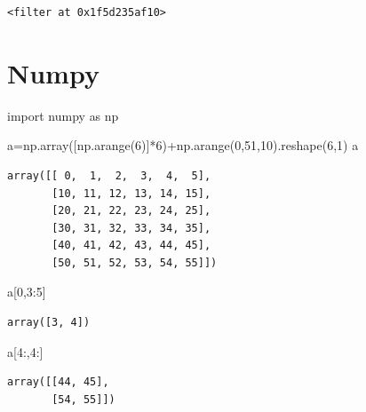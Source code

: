 \documentclass[
  a4paper,
  DIV=11,
  numbers=noendperiod]{scrreprt}
\newenvironment{Shaded}{\begin{snugshade}}{\end{snugshade}}
\newcommand{\DecValTok}[1]{\textcolor[rgb]{0.68,0.00,0.00}{#1}}
\newcommand{\ImportTok}[1]{\textcolor[rgb]{0.00,0.46,0.62}{#1}}
\newcommand{\NormalTok}[1]{\textcolor[rgb]{0.00,0.23,0.31}{#1}}
\newcommand{\OperatorTok}[1]{\textcolor[rgb]{0.37,0.37,0.37}{#1}}
\begin{document}
\begin{verbatim}
<filter at 0x1f5d235af10>
\end{verbatim}

\chapter{Numpy}\label{numpy}

\begin{Shaded}
\begin{Highlighting}[]
\ImportTok{import}\NormalTok{ numpy }\ImportTok{as}\NormalTok{ np}
\end{Highlighting}
\end{Shaded}

\begin{Shaded}
\begin{Highlighting}[]
\NormalTok{a}\OperatorTok{=}\NormalTok{np.array([np.arange(}\DecValTok{6}\NormalTok{)]}\OperatorTok{*}\DecValTok{6}\NormalTok{)}\OperatorTok{+}\NormalTok{np.arange(}\DecValTok{0}\NormalTok{,}\DecValTok{51}\NormalTok{,}\DecValTok{10}\NormalTok{).reshape(}\DecValTok{6}\NormalTok{,}\DecValTok{1}\NormalTok{)}
\NormalTok{a}
\end{Highlighting}
\end{Shaded}

\begin{verbatim}
array([[ 0,  1,  2,  3,  4,  5],
       [10, 11, 12, 13, 14, 15],
       [20, 21, 22, 23, 24, 25],
       [30, 31, 32, 33, 34, 35],
       [40, 41, 42, 43, 44, 45],
       [50, 51, 52, 53, 54, 55]])
\end{verbatim}

\begin{Shaded}
\begin{Highlighting}[]
\NormalTok{a[}\DecValTok{0}\NormalTok{,}\DecValTok{3}\NormalTok{:}\DecValTok{5}\NormalTok{]}
\end{Highlighting}
\end{Shaded}

\begin{verbatim}
array([3, 4])
\end{verbatim}

\begin{Shaded}
\begin{Highlighting}[]
\NormalTok{a[}\DecValTok{4}\NormalTok{:,}\DecValTok{4}\NormalTok{:]}
\end{Highlighting}
\end{Shaded}

\begin{verbatim}
array([[44, 45],
       [54, 55]])
\end{verbatim}
\end{document}
